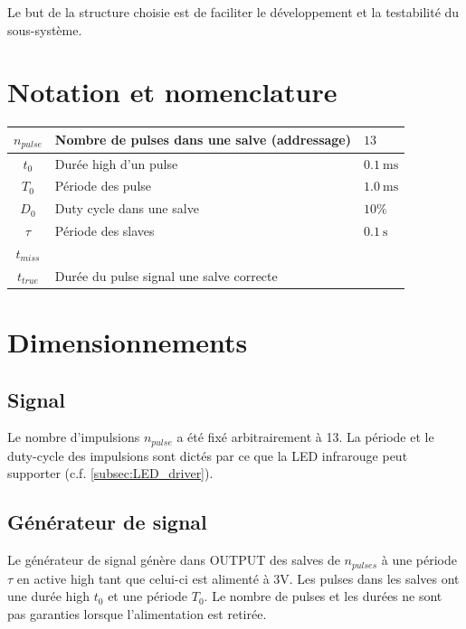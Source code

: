 \documentclass[french]{layout/Report}
\begin{document}
Le but de la structure choisie est de faciliter le développement et la testabilité
du sous-système.



\section{Notation et nomenclature}

\begin{center}
	\begin{tabular}{| c | l | l |}
		\hline
		$n_{pulse}$	& Nombre de pulses dans une salve (addressage) & $13$ \\ \hline
		$t_0$				& Durée high d'un pulse	& $\SI{0.1}{\milli\second}$	\\ \hline
		$T_0$				& Période des pulse	& $\SI{1.0}{\milli\second}$	\\ \hline
		$D_0$				& Duty cycle dans une salve & $10\%$	\\ \hline
		$\tau$			& Période des slaves	& $\SI{0.1}{\second}$\\ \hline
		$t_{miss}$  & &\\ \hline
		$t_{true}$  & Durée du pulse signal une salve correcte & \\ \hline
	\end{tabular}
\end{center}

\section{Dimensionnements}
\subsection{Signal}
Le nombre d'impulsions $n_{pulse}$ a été fixé arbitrairement à 13. La période et le duty-cycle des impulsions sont dictés par ce que la LED infrarouge peut supporter (c.f. \ref{subsec:LED_driver}).

\subsection{Générateur de signal}
Le générateur de signal génère dans OUTPUT des salves de $n_{pulses}$ à une période $\tau$ en active high tant que celui-ci est alimenté à 3V. Les pulses dans les salves ont une durée high $t_0$ et une période $T_0$. Le nombre de pulses et les durées ne sont pas garanties lorsque l'alimentation est retirée.
\end{document}
